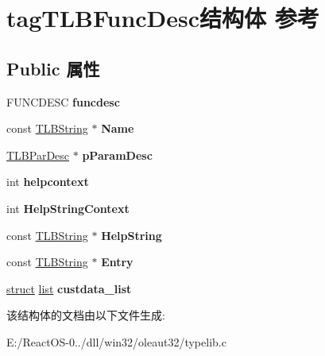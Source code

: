 \hypertarget{structtag_t_l_b_func_desc}{}\section{tag\+T\+L\+B\+Func\+Desc结构体 参考}
\label{structtag_t_l_b_func_desc}
\subsection*{Public 属性}
\begin{DoxyCompactItemize}
\item 
\mbox{\label{structtag_t_l_b_func_desc_a97a60e9086efabf409c8fa3a37f7df68}} 
F\+U\+N\+C\+D\+E\+SC {\bfseries funcdesc}
\item 
\mbox{\label{structtag_t_l_b_func_desc_acebd60b92ff3ada0987c51071e9e6789}} 
const \hyperlink{structtag_t_l_b_string}{T\+L\+B\+String} $\ast$ {\bfseries Name}
\item 
\mbox{\label{structtag_t_l_b_func_desc_aca60c7f6923b6bb3a59ff5ce51dc4af1}} 
\hyperlink{structtag_t_l_b_par_desc}{T\+L\+B\+Par\+Desc} $\ast$ {\bfseries p\+Param\+Desc}
\item 
\mbox{\label{structtag_t_l_b_func_desc_ade7dc1303d49bff12fcec75f6d4906d4}} 
int {\bfseries helpcontext}
\item 
\mbox{\label{structtag_t_l_b_func_desc_a86db75a30dfba6b9b24e0c32856abd53}} 
int {\bfseries Help\+String\+Context}
\item 
\mbox{\label{structtag_t_l_b_func_desc_af23ef206fa9a1f6470b9bdb9460df445}} 
const \hyperlink{structtag_t_l_b_string}{T\+L\+B\+String} $\ast$ {\bfseries Help\+String}
\item 
\mbox{\label{structtag_t_l_b_func_desc_ac106c88ef30f6090c2a8c1f21d81d64f}} 
const \hyperlink{structtag_t_l_b_string}{T\+L\+B\+String} $\ast$ {\bfseries Entry}
\item 
\mbox{\label{structtag_t_l_b_func_desc_af295a14d27938fa23d061412c0236abc}} 
\hyperlink{interfacestruct}{struct} \hyperlink{classlist}{list} {\bfseries custdata\+\_\+list}
\end{DoxyCompactItemize}


该结构体的文档由以下文件生成\+:\begin{DoxyCompactItemize}
\item 
E\+:/\+React\+O\+S-\/0../dll/win32/oleaut32/typelib.\+c\end{DoxyCompactItemize}
